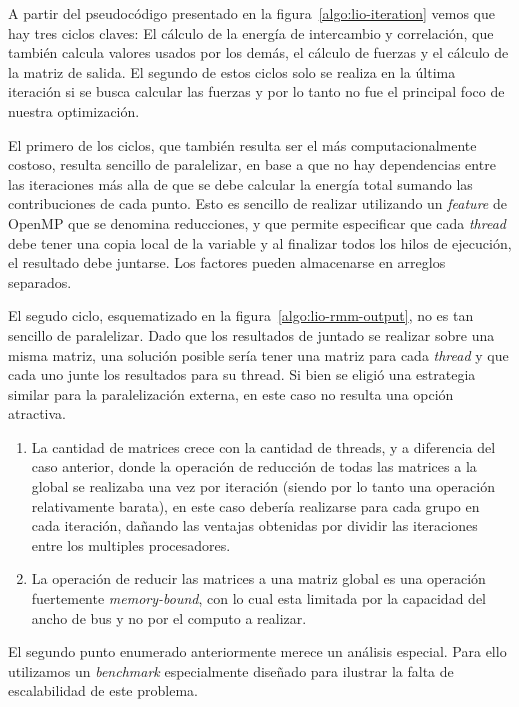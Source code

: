 A partir del pseudoc\'odigo presentado en la figura~\ref{algo:lio-iteration} vemos
que hay tres ciclos claves: El c\'alculo de la energ\'ia de intercambio y 
correlaci\'on, que tambi\'en calcula valores usados por los dem\'as, el
c\'alculo de fuerzas y el c\'alculo de la matriz de salida. El segundo de estos
ciclos solo se realiza en la \'ultima iteraci\'on si se busca calcular las fuerzas
y por lo tanto no fue el principal foco de nuestra optimizaci\'on.

El primero de los ciclos, que tambi\'en resulta ser el m\'as computacionalmente
costoso, resulta sencillo de paralelizar, en base a que no hay dependencias entre
las iteraciones m\'as alla de que se debe calcular la energ\'ia total sumando
las contribuciones de cada punto. Esto es sencillo de realizar utilizando un
\textit{feature} de OpenMP que se denomina reducciones, y que permite especificar
que cada \textit{thread} debe tener una copia local de la variable y al finalizar
todos los hilos de ejecuci\'on, el resultado debe juntarse. Los factores pueden
almacenarse en arreglos separados.

El segudo ciclo, esquematizado en la figura~\ref{algo:lio-rmm-output}, no es tan
sencillo de paralelizar. Dado que los resultados de juntado se realizar sobre 
una misma matriz, una soluci\'on posible ser\'ia tener una matriz para cada
\textit{thread} y que cada uno junte los resultados para su thread. Si bien se
eligi\'o una estrategia similar para la paralelizaci\'on externa, en este caso no
resulta una opci\'on atractiva.

\begin{enumerate}
    \item La cantidad de matrices crece con la cantidad de threads, y a diferencia
    del caso anterior, donde la operaci\'on de reducci\'on de todas las matrices
    a la global se realizaba una vez por iteraci\'on (siendo por lo tanto 
    una operaci\'on relativamente barata), en este caso deber\'ia realizarse para
    cada grupo en cada iteraci\'on, da\~nando las ventajas obtenidas por dividir
    las iteraciones entre los multiples procesadores.
    \item La operaci\'on de reducir las matrices a una matriz global es una 
    operaci\'on fuertemente \textit{memory-bound}, con lo cual esta limitada por
    la capacidad del ancho de bus y no por el computo a realizar. 
\end{enumerate}

El segundo punto enumerado anteriormente merece un an\'alisis especial. Para ello
utilizamos un \textit{benchmark} especialmente dise\~nado para ilustrar la falta
de escalabilidad de este problema. 

